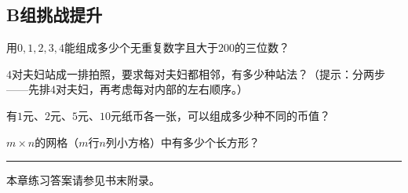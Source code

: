 \subsection*{B组\quad 挑战提升}

\begin{exercise}
\item 用$0,1,2,3,4$能组成多少个无重复数字且大于$200$的三位数？
\item $4$对夫妇站成一排拍照，要求每对夫妇都相邻，有多少种站法？（提示：分两步——先排$4$对夫妇，再考虑每对内部的左右顺序。）
\item 有$1$元、$2$元、$5$元、$10$元纸币各一张，可以组成多少种不同的币值？
\item $m\times n$的网格（$m$行$n$列小方格）中有多少个长方形？
\end{exercise}

\vfill
\noindent\rule{\textwidth}{0.4pt}
本章练习答案请参见书末附录。
